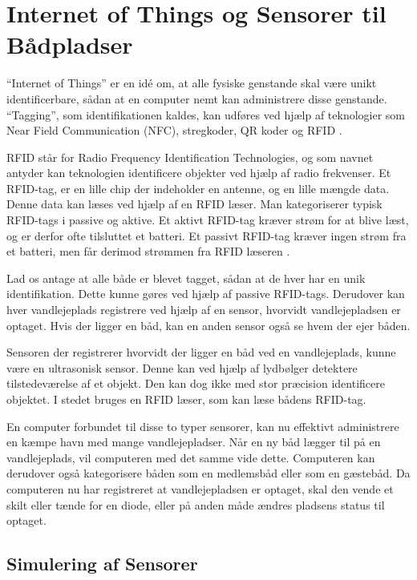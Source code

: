 \section{Internet of Things og Sensorer til Bådpladser} %
\label{sec:internet_of_things}

\enquote{Internet of Things} er en idé om, at alle fysiske genstande skal være unikt identificerbare, sådan at en computer nemt kan administrere disse genstande. \enquote{Tagging}, som identifikationen kaldes, kan udføres ved hjælp af teknologier som Near Field Communication (NFC), stregkoder, QR koder og RFID \cite{iot2013}.

RFID står for Radio Frequency Identification Technologies, og som navnet antyder kan teknologien identificere objekter ved hjælp af radio frekvenser. Et RFID-tag, er en lille chip der indeholder en antenne, og en lille mængde data. Denne data kan læses ved hjælp af en RFID læser. Man kategoriserer typisk RFID-tags i passive og aktive. Et aktivt RFID-tag kræver strøm for at blive læst, og er derfor ofte tilsluttet et batteri. Et passivt RFID-tag kræver ingen strøm fra et batteri, men får derimod strømmen fra RFID læseren \cite{want2006rfid}.

Lad os antage at alle både er blevet tagget, sådan at de hver har en unik identifikation. Dette kunne gøres ved hjælp af passive RFID-tags. Derudover kan hver vandlejeplads registrere ved hjælp af en sensor, hvorvidt vandlejepladsen er optaget. Hvis der ligger en båd, kan en anden sensor også se hvem der ejer båden.

Sensoren der registrerer hvorvidt der ligger en båd ved en vandlejeplads, kunne være en ultrasonisk sensor. Denne kan ved hjælp af lydbølger detektere tilstedeværelse af et objekt. Den kan dog ikke med stor præcision identificere objektet. I stedet bruges en RFID læser, som kan læse bådens RFID-tag.

En computer forbundet til disse to typer sensorer, kan nu effektivt administrere en kæmpe havn med mange vandlejepladser. Når en ny båd lægger til på en vandlejeplads, vil computeren med det samme vide dette. Computeren kan derudover også kategorisere båden som en medlemsbåd eller som en gæstebåd. Da computeren nu har registreret at vandlejepladsen er optaget, skal den vende et skilt eller tænde for en diode, eller på anden måde ændres pladsens status til optaget.


\subsection{Simulering af Sensorer}

